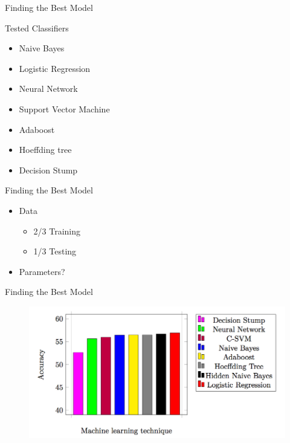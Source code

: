 \begin{frame}{Finding the Best Model}

Tested Classifiers

\begin{itemize}
\item Naive Bayes 
\item Logistic Regression
\item Neural Network
\item Support Vector Machine
\item Adaboost
\item Hoeffding tree
\item Decision Stump
\end{itemize}
\end{frame}

\begin{frame}{Finding the Best Model}
\begin{itemize}
\item Data \begin{itemize}
		\item 2/3 Training
		\item 1/3 Testing
           \end{itemize}
\item Parameters? 

\end{itemize}

\end{frame}

\begin{frame}{Finding the Best Model}

  \begin{figure}[H]
    \includegraphics[width=\linewidth]{prediction/bestml.png}
  \end{figure}

\end{frame}

